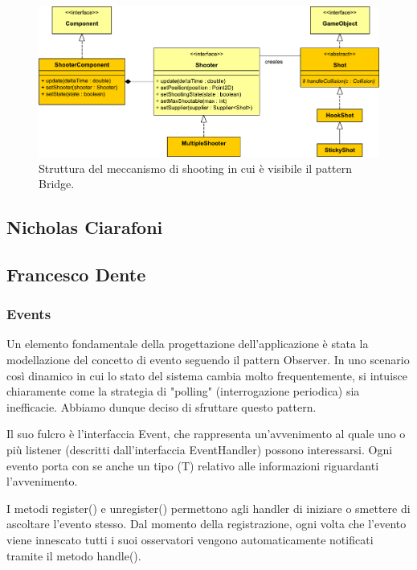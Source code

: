 \documentclass[a4paper,12pt]{report}
\begin{document}
\begin{figure}[H]
\includegraphics[width=\linewidth]{img/shooter}
\caption{Struttura del meccanismo di shooting in cui è visibile il pattern Bridge.}
\label{img:shooter}
\end{figure}

\subsection*{Nicholas Ciarafoni}

\subsection*{Francesco Dente}

\subsubsection*{Events}

Un elemento fondamentale della progettazione dell'applicazione è stata la modellazione del concetto di evento seguendo il pattern Observer.
In uno scenario così dinamico in cui lo stato del sistema cambia molto frequentemente, si intuisce chiaramente come la strategia di "polling" (interrogazione periodica) sia inefficacie.
Abbiamo dunque deciso di sfruttare questo pattern.

Il suo fulcro è l'interfaccia Event, che rappresenta un'avvenimento al quale uno o più listener (descritti dall'interfaccia EventHandler) possono interessarsi.
Ogni evento porta con se anche un tipo (T) relativo alle informazioni riguardanti l'avvenimento.

I metodi register() e unregister() permettono agli handler di iniziare o smettere di ascoltare l'evento stesso.
Dal momento della registrazione, ogni volta che l'evento viene innescato tutti i suoi osservatori vengono automaticamente notificati tramite il metodo handle().
\end{document}
